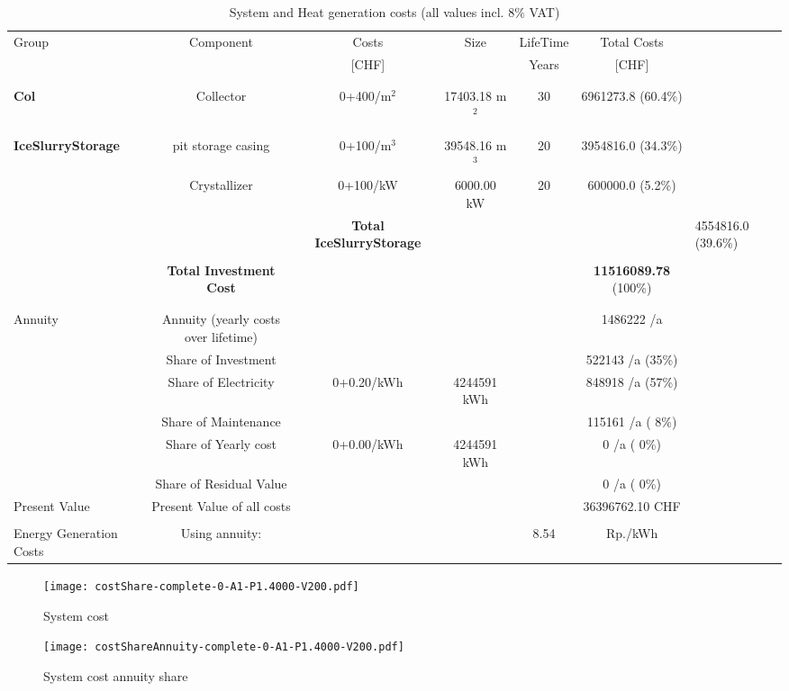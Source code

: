 \documentclass[english]{SPFShortReport}
\begin{document}
\begin{table}[!ht]
\centering
\caption{System and Heat generation costs (all values incl. 8$\%$ VAT) }
\begin{adjustbox}{max width =\textwidth}
\begin{tabular}{l | c c c c c } 
\hline
\hline
Group &Component &Costs &Size &LifeTime &Total Costs \\ 
 & &[CHF] & &Years &[CHF]\\ 
\hline
\\
\hline \\
\textbf{Col} & Collector & 0+400/m$^2$ & 17403.18 m$^2$ & 30 & 6961273.8 (60.4\%) \\
\hline \\
\hline \\
\textbf{IceSlurryStorage} & pit storage casing & 0+100/m$^3$ & 39548.16 m$^3$ & 20 & 3954816.0 (34.3\%) \\
 & Crystallizer & 0+100/kW & 6000.00 kW & 20 & 600000.0 (5.2\%) \\
&
 & \textbf{Total IceSlurryStorage} & & & & 4554816.0 (39.6\%) \\
\hline \\
 & \textbf{Total Investment Cost} & & & & \textbf{11516089.78} (100\%) \\ 
\hline \\ 
\hline \\ 
Annuity & Annuity (yearly costs over lifetime)  &&& & 1486222 /a  \\
 & Share of Investment & &&& 522143 /a (35\%) \\
 & Share of Electricity & 0+0.20/kWh & 4244591 kWh &  & 848918 /a (57\%)\\
 & Share of Maintenance & &&& 115161 /a ( 8\%)\\ 
 & Share of Yearly cost & 0+0.00/kWh & 4244591 kWh & &  0 /a ( 0\%)\\
 & Share of Residual Value &&& &  0 /a ( 0\%)\\
Present Value  & Present Value of all costs  & &&& 36396762.10 CHF \\
\hline \\ 
 Energy Generation Costs & Using annuity: &&& 8.54 & Rp./kWh \\
\hline
\hline
\end{tabular}
\end{adjustbox}
\label{CostsTable}
\end{table}
\begin{figure}[!htbp]
\begin{center}
\texttt{[image: costShare-complete-0-A1-P1.4000-V200.pdf]}
\caption{System cost}
\label{systemCost}
\end{center}
\end{figure}
\begin{figure}[!htbp]
\begin{center}
\texttt{[image: costShareAnnuity-complete-0-A1-P1.4000-V200.pdf]}
\caption{System cost annuity share}
\label{systemCostannuity}
\end{center}
\end{figure}
\end{document}
